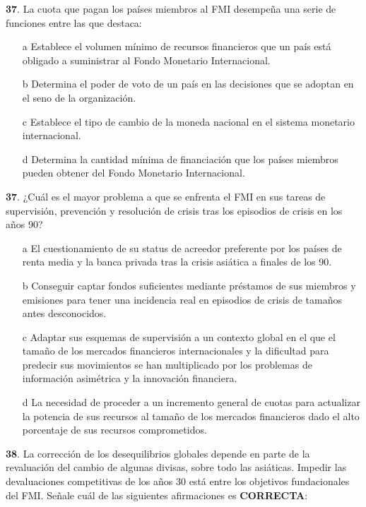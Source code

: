 \documentclass{nuevotema}
\begin{document}
\textbf{37}. La cuota que pagan los países miembros al FMI desempeña una serie de funciones entre las que destaca:

\begin{enumerate}
	\item[a] Establece el volumen mínimo de recursos financieros que un país está obligado a suministrar al Fondo Monetario Internacional.
	\item[b] Determina el poder de voto de un país en las decisiones que se adoptan en el seno de la organización.
	\item[c] Establece el tipo de cambio de la moneda nacional en el sistema monetario internacional.
	\item[d] Determina la cantidad mínima de financiación que los países miembros pueden obtener del Fondo Monetario Internacional.
\end{enumerate}


\textbf{37}. ¿Cuál es el mayor problema a que se enfrenta el FMI en sus tareas de supervisión, prevención y resolución de crisis tras los episodios de crisis en los años 90?

\begin{enumerate}
	\item[a] El cuestionamiento de su status de acreedor preferente por los países de renta media y la banca privada tras la crisis asiática a finales de los 90.
	\item[b] Conseguir captar fondos suficientes mediante préstamos de sus miembros y emisiones para tener una incidencia real en episodios de crisis de tamaños antes desconocidos. 
	\item[c] Adaptar sus esquemas de supervisión a un contexto global en el que el tamaño de los mercados financieros internacionales y la dificultad para predecir sus movimientos se han multiplicado por los problemas de información asimétrica y la innovación financiera.
	\item[d] La necesidad de proceder a un incremento general de cuotas para actualizar la potencia de sus recursos al tamaño de los mercados financieros dado el alto porcentaje de sus recursos comprometidos.
\end{enumerate}

\textbf{38}. La corrección de los desequilibrios globales depende en parte de la revaluación del cambio de algunas divisas, sobre todo las asiáticas. Impedir las devaluaciones competitivas de los años 30 está entre los objetivos fundacionales del FMI. Señale cuál de las siguientes afirmaciones es \textbf{CORRECTA}:
\end{document}
